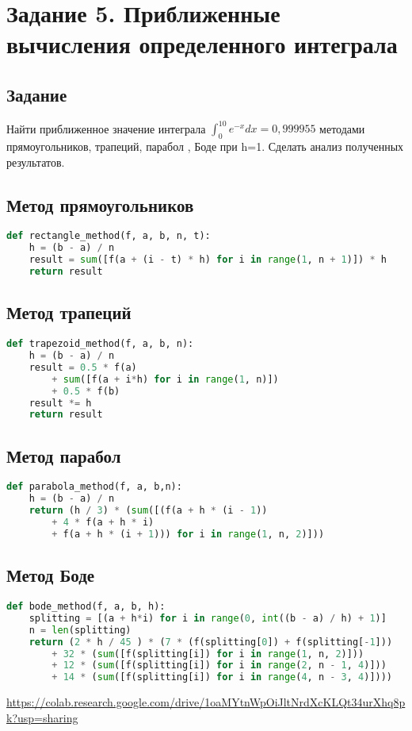 \section{Задание 5. Приближенные вычисления определенного интеграла}
\subsection*{Задание}
Найти приближенное значение интеграла $ \int_0^{10}{e^{-x}	dx} = 0,999955 $ методами прямоугольников, трапеций, парабол , Боде при h=1. Сделать анализ полученных результатов.
\subsection*{Метод прямоугольников}
\begin{lstlisting}[language=Python]
def rectangle_method(f, a, b, n, t):
	h = (b - a) / n
	result = sum([f(a + (i - t) * h) for i in range(1, n + 1)]) * h
	return result
\end{lstlisting}
\subsection*{Метод трапеций}
\begin{lstlisting}[language=Python]
def trapezoid_method(f, a, b, n):
	h = (b - a) / n
	result = 0.5 * f(a) 
		+ sum([f(a + i*h) for i in range(1, n)]) 
		+ 0.5 * f(b)
	result *= h
	return result
\end{lstlisting}
\subsection*{Метод парабол}
\begin{lstlisting}[language=Python]
def parabola_method(f, a, b,n):
	h = (b - a) / n
	return (h / 3) * (sum([(f(a + h * (i - 1)) 
		+ 4 * f(a + h * i) 
		+ f(a + h * (i + 1))) for i in range(1, n, 2)]))
\end{lstlisting}
\subsection*{Метод Боде}
\begin{lstlisting}[language=Python]
def bode_method(f, a, b, h):
	splitting = [(a + h*i) for i in range(0, int((b - a) / h) + 1)]
	n = len(splitting)
	return (2 * h / 45 ) * (7 * (f(splitting[0]) + f(splitting[-1])) 
		+ 32 * (sum([f(splitting[i]) for i in range(1, n, 2)]))
		+ 12 * (sum([f(splitting[i]) for i in range(2, n - 1, 4)])) 
		+ 14 * (sum([f(splitting[i]) for i in range(4, n - 3, 4)])))
\end{lstlisting}
\url{https://colab.research.google.com/drive/1oaMYtnWpOiJltNrdXcKLQt34urXhq8pk?usp=sharing}

